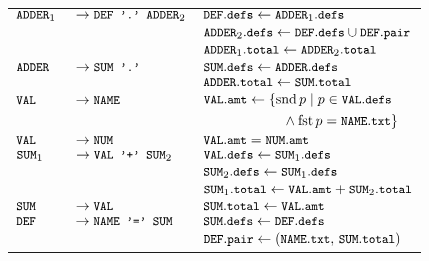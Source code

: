 \begin{figure}[btp]
{\begin{tabular}{l@{}ll}
$\mt{ADDER}_1$  &$\,\produces \mt{DEF '.' ADDER}_2$
     &$\mt{DEF}.\mt{defs} \gets \mt{ADDER}_1.\mt{defs}$\\
    &&$\mt{ADDER}_2.\mt{defs} \gets 
            \mt{DEF}.\mt{defs} \union \mt{DEF}.\mt{pair}$\\
    &&$\mt{ADDER}_1.\mt{total} \gets \mt{ADDER}_2.\mt{total}$\\
$\mt{ADDER}$    &$\,\produces \mt{SUM '.'}$
     &$\mt{SUM}.\mt{defs} \gets \mt{ADDER}.\mt{defs}$\\
    &&$\mt{ADDER}.\mt{total} \gets \mt{SUM}.\mt{total}$\\
$\mt{VAL}$      &$\,\produces \mt{NAME}$
     &$\mt{VAL}.\mt{amt} \gets 
                  \{\operatorname{snd} p 
                    \where p \in \mt{VAL}.\mt{defs}$\\
                    &&$\hphantom{\mt{VAL}.\mt{amt} \gets 
                                    \{s}%
                    \land \operatorname{fst} p = \mt{NAME}.\mt{txt}\}$\\
$\mt{VAL}$      &$\,\produces \mt{NUM}$
     &$\mt{VAL}.\mt{amt} = \mt{NUM}.\mt{amt}$\\
$\mt{SUM}_1$    &$\,\produces \mt{VAL '+' SUM}_2$
     &$\mt{VAL}.\mt{defs} \gets \mt{SUM}_1.\mt{defs}$\\
    && $\mt{SUM}_2.\mt{defs} \gets \mt{SUM}_1.\mt{defs}$\\
    &&$\mt{SUM}_1.\mt{total} \gets \mt{VAL}.\mt{amt} + \mt{SUM}_2.\mt{total}$\\
$\mt{SUM}$      &$\,\produces \mt{VAL}$
     &$\mt{SUM}.\mt{total} \gets \mt{VAL}.\mt{amt}$\\
$\mt{DEF}$      &$\,\produces \mt{NAME '=' SUM}$
     &$\mt{SUM}.\mt{defs} \gets \mt{DEF}.\mt{defs}$\\
    &&$\mt{DEF}.\mt{pair} \gets \pair{\mt{NAME}.\mt{txt}}{\mt{SUM}.\mt{total}}$\\
\bottomrule
\end{tabular}%
}
\end{figure}
